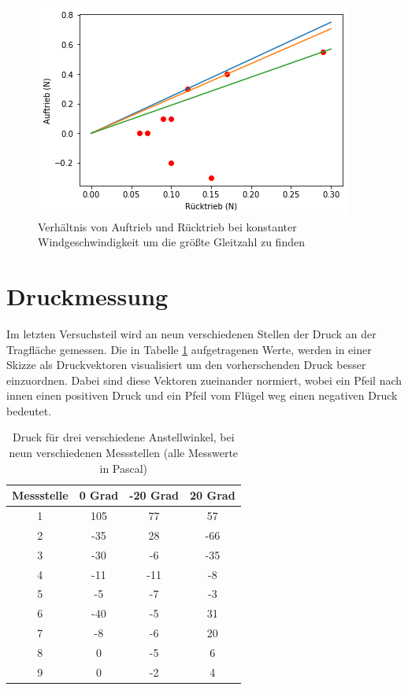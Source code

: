 \begin{figure}
    \centering
    \includegraphics[scale=0.8]{Aeromechanik/Protokoll/fig/Aeromechanik Versuch 3.13.png}
    \caption{Verhältnis von Auftrieb und Rücktrieb bei konstanter Windgeschwindigkeit um die größte Gleitzahl zu finden}
    \label{fig:Aeromechanik Versuch 3.13}
\end{figure}

\section{Druckmessung}

Im letzten Versuchsteil wird an neun verschiedenen Stellen der Druck an der Tragfläche gemessen. Die in Tabelle \ref{tab:Aeromechanik Versuch 3.2} aufgetragenen Werte, werden in einer Skizze als Druckvektoren visualisiert um den vorherschenden Druck besser einzuordnen. Dabei sind diese Vektoren zueinander normiert, wobei ein Pfeil nach innen einen positiven Druck und ein Pfeil vom Flügel weg einen negativen Druck bedeutet.

\begin{table}
    \centering
    \caption{Druck für drei verschiedene Anstellwinkel, bei neun verschiedenen Messstellen (alle Messwerte in Pascal)}
    \begin{tabular}{c c c c}
    \hline
    Messstelle & 0 Grad & -20 Grad & 20 Grad \\
    \hline
    1 & 105 & 77 & 57 \\
    2 & -35 &  28 & -66 \\
    3 & -30 & -6 & -35 \\
    4 & -11 & -11 & -8 \\
    5 & -5 & -7 & -3 \\
    6 & -40 & -5 & 31 \\
    7 & -8 & -6 & 20 \\
    8 & 0 & -5 & 6 \\
    9 & 0 & -2 & 4 \\
    \hline
    \end{tabular}
    \label{tab:Aeromechanik Versuch 3.2}
\end{table}


